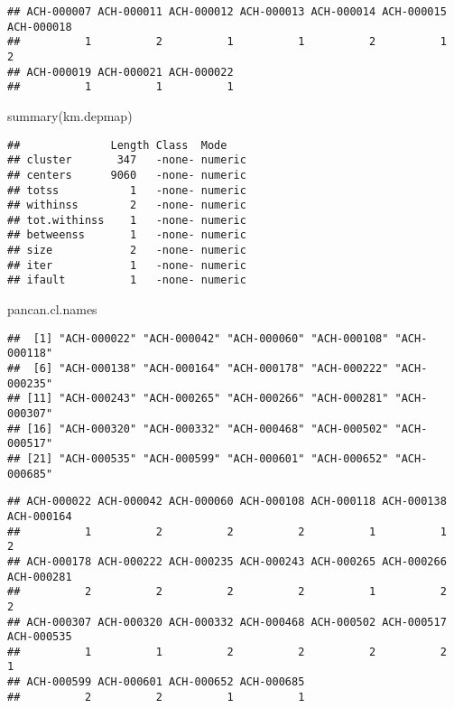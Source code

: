 \documentclass[
]{article}
\newenvironment{Shaded}{\begin{snugshade}}{\end{snugshade}}
\newcommand{\FunctionTok}[1]{\textcolor[rgb]{0.00,0.00,0.00}{#1}}
\newcommand{\NormalTok}[1]{#1}
\newcommand{\SpecialCharTok}[1]{\textcolor[rgb]{0.00,0.00,0.00}{#1}}
\begin{document}
\begin{verbatim}
## ACH-000007 ACH-000011 ACH-000012 ACH-000013 ACH-000014 ACH-000015 ACH-000018 
##          1          2          1          1          2          1          2 
## ACH-000019 ACH-000021 ACH-000022 
##          1          1          1
\end{verbatim}

\begin{Shaded}
\begin{Highlighting}[]
\FunctionTok{summary}\NormalTok{(km.depmap)}
\end{Highlighting}
\end{Shaded}

\begin{verbatim}
##              Length Class  Mode   
## cluster       347   -none- numeric
## centers      9060   -none- numeric
## totss           1   -none- numeric
## withinss        2   -none- numeric
## tot.withinss    1   -none- numeric
## betweenss       1   -none- numeric
## size            2   -none- numeric
## iter            1   -none- numeric
## ifault          1   -none- numeric
\end{verbatim}

\begin{Shaded}
\begin{Highlighting}[]
\NormalTok{pancan.cl.names}
\end{Highlighting}
\end{Shaded}

\begin{verbatim}
##  [1] "ACH-000022" "ACH-000042" "ACH-000060" "ACH-000108" "ACH-000118"
##  [6] "ACH-000138" "ACH-000164" "ACH-000178" "ACH-000222" "ACH-000235"
## [11] "ACH-000243" "ACH-000265" "ACH-000266" "ACH-000281" "ACH-000307"
## [16] "ACH-000320" "ACH-000332" "ACH-000468" "ACH-000502" "ACH-000517"
## [21] "ACH-000535" "ACH-000599" "ACH-000601" "ACH-000652" "ACH-000685"
\end{verbatim}

\begin{Shaded}
\end{Shaded}

\begin{verbatim}
## ACH-000022 ACH-000042 ACH-000060 ACH-000108 ACH-000118 ACH-000138 ACH-000164 
##          1          2          2          2          1          1          2 
## ACH-000178 ACH-000222 ACH-000235 ACH-000243 ACH-000265 ACH-000266 ACH-000281 
##          2          2          2          2          1          2          2 
## ACH-000307 ACH-000320 ACH-000332 ACH-000468 ACH-000502 ACH-000517 ACH-000535 
##          1          1          2          2          2          2          1 
## ACH-000599 ACH-000601 ACH-000652 ACH-000685 
##          2          2          1          1
\end{verbatim}
\end{document}
